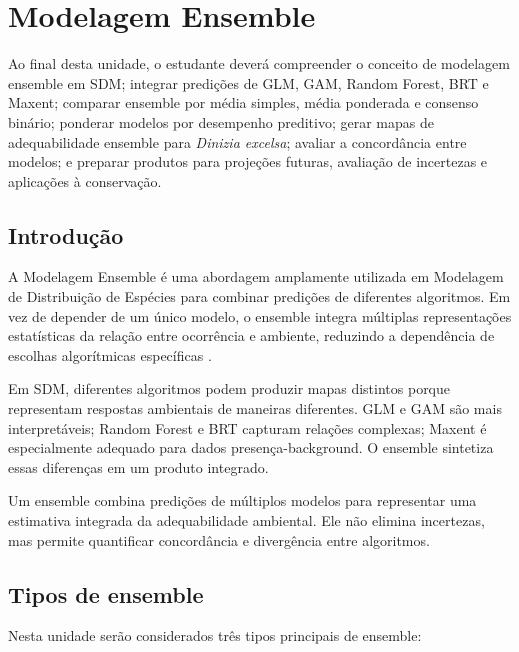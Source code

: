 \chapter[Modelagem Ensemble]{Modelagem Ensemble}

\begin{objetivos}
	Ao final desta unidade, o estudante deverá compreender o conceito de modelagem ensemble em SDM; integrar predições de GLM, GAM, Random Forest, BRT e Maxent; comparar ensemble por média simples, média ponderada e consenso binário; ponderar modelos por desempenho preditivo; gerar mapas de adequabilidade ensemble para \textit{Dinizia excelsa}; avaliar a concordância entre modelos; e preparar produtos para projeções futuras, avaliação de incertezas e aplicações à conservação.
\end{objetivos}

\section{Introdução}

A Modelagem Ensemble é uma abordagem amplamente utilizada em Modelagem de Distribuição de Espécies para combinar predições de diferentes algoritmos. Em vez de depender de um único modelo, o ensemble integra múltiplas representações estatísticas da relação entre ocorrência e ambiente, reduzindo a dependência de escolhas algorítmicas específicas \parencite{araujo2007ensemble,thuiller2009biomod,guisan2017habitat}.

Em SDM, diferentes algoritmos podem produzir mapas distintos porque representam respostas ambientais de maneiras diferentes. GLM e GAM são mais interpretáveis; Random Forest e BRT capturam relações complexas; Maxent é especialmente adequado para dados presença-background. O ensemble sintetiza essas diferenças em um produto integrado.

\begin{conceito}[title={\faBook\quad Ensemble em SDM}]
	Um ensemble combina predições de múltiplos modelos para representar uma estimativa integrada da adequabilidade ambiental. Ele não elimina incertezas, mas permite quantificar concordância e divergência entre algoritmos.
\end{conceito}

\section{Tipos de ensemble}

Nesta unidade serão considerados três tipos principais de ensemble:

